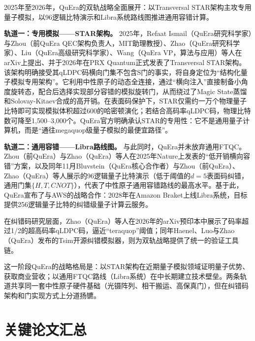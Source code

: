 \documentclass[11pt,a4paper]{ctexart}
\begin{document}
2025年至2026年，QuEra的双轨战略全面展开：以Transversal STAR架构主攻专用量子模拟，以96逻辑比特演示和Libra系统路线图推进通用容错计算。

\textbf{轨道一：专用模拟——STAR架构。} 2025年，Refaat Ismail（QuEra研究科学家）与Zhou（前QuEra QEC架构负责人，MIT助理教授）、Zhao（QuEra研究科学家）、Liu（QuEra高级研究科学家）、Wang（QuEra VP，算法与应用）等人在arXiv上提出、并于2026年在PRX Quantum正式发表了Transversal STAR架构。该架构明确接受其qLDPC码横向门集不包含S门的事实，将自身定位为``结构化量子模拟专用架构''。它利用中性原子的动态全连接，通过``横向注入''直接制备小角度旋转态，配合后选择实现部分容错的模拟旋转门，从而绕过了Magic State蒸馏和Solovay-Kitaev合成的高开销。在表面码保护下，STAR仅需约一万个物理量子比特即可实现模拟体积超过600的哈密顿演化；若结合高码率qLDPC码，物理比特数可降至1,500--3,000个。QuEra官方明确承认STAR的专用性：它不是通用量子计算机，而是``通往megaquop级量子模拟的最便宜路径''。

\textbf{轨道二：通用容错——Libra路线图。} 与此同时，QuEra并未放弃通用FTQC。Zhou（前QuEra）与Zhao（QuEra）等人在2025年Nature上发表的``低开销横向容错''方案，以及同年11月Bluvstein（QuEra核心合作者）与Zhou（前QuEra）、Zhao（QuEra）等人展示的96逻辑量子比特演示（低于阈值的$d=5$表面码纠错，通用门集$\{H, T, CNOT\}$），代表了中性原子通用容错路线的最高水平。基于此，QuEra宣布了与AWS的战略合作：2028年在Amazon Braket上线Libra系统，目标提供256逻辑量子比特的纠错级量子计算云服务。

在纠错码研究层面，Zhao（QuEra）等人在2026年的arXiv预印本中展示了码率超过1/2的超高码率qLDPC码，逼近``teraquop''阈值；同年Haenel、Luo与Zhao（QuEra）发布的Tsim开源纠错模拟器，则为双轨战略提供了统一的验证工具链。

这一阶段QuEra的战略格局是：以STAR架构在近期量子模拟领域证明量子优势、获取商业营收；以通用FTQC路线（Libra系统）在中长期建立技术壁垒。两条轨道共享同一套中性原子硬件基础（光镊阵列、相干搬运、高保真门），但在纠错码架构和门实现方式上分道扬镳。

\section{关键论文汇总}
\end{document}
